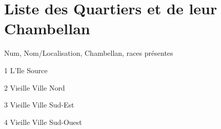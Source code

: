 \section{Liste des Quartiers et de leur Chambellan}

Num, Nom/Localisation, Chambellan, races présentes

1 L'Ile Source

2 Vieille Ville Nord

3 Vieille Ville Sud-Est

4 Vieille Ville Sud-Ouest

